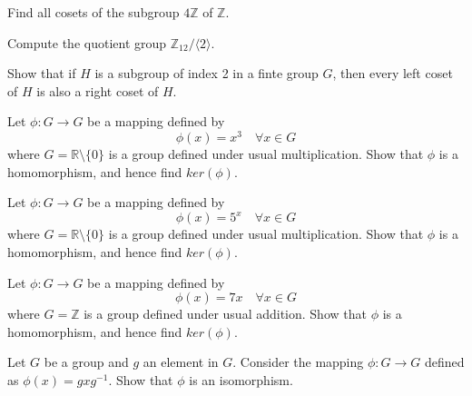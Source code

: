 \begin{mdframed}
    \vspace{0.752cm}
    \begin{Exercise}
        Find all cosets of the subgroup $4\mathbb{Z}$ of $\mathbb{Z}$.
    \end{Exercise}

    \vspace{0.752cm}
    \begin{Exercise}
        Compute the quotient group $\mathbb{Z}_{12}/ \langle 2 \rangle$.
    \end{Exercise}

    \vspace{0.752cm}
    \begin{Exercise}
        Show that if $H$ is a subgroup of index 2 in a finte group $G$, then every left coset of $H$ is also a 
        right coset of $H$.
    \end{Exercise}

    \vspace{0.752cm}
    \begin{Exercise}
        Let $\phi: G \to G$ be a mapping defined by 
                \[
                    \phi(x) = x^3 \quad \forall x \in G
                \]
                where $G = \mathbb{R} \setminus \{ 0 \}$ is a group defined under usual multiplication. Show that 
                $\phi$ is a homomorphism, and hence find $ker(\phi)$.
    \end{Exercise}

    \vspace{0.752cm}
    \begin{Exercise}
        Let $\phi: G \to G$ be a mapping defined by 
                \[
                    \phi(x) = 5^x \quad \forall x \in G
                \]
                where $G = \mathbb{R} \setminus \{ 0 \}$ is a group defined under usual multiplication. Show that 
                $\phi$ is a homomorphism, and hence find $ker(\phi)$.
    \end{Exercise}

    \vspace{0.752cm}
    \begin{Exercise}
        Let $\phi: G \to G$ be a mapping defined by 
                \[
                    \phi(x) = 7x \quad \forall x \in G
                \]
                where $G = \mathbb{Z}$ is a group defined under usual addition. Show that 
                $\phi$ is a homomorphism, and hence find $ker(\phi)$.
    \end{Exercise}

    \vspace{0.752cm}
    \begin{Exercise}
        Let $G$ be a group and $g$ an element in $G$. Consider the mapping $\phi:G \to G$ defined as 
        $\phi(x) = gxg^{-1}$. Show that $\phi$ is an isomorphism.
    \end{Exercise}


\end{mdframed}
